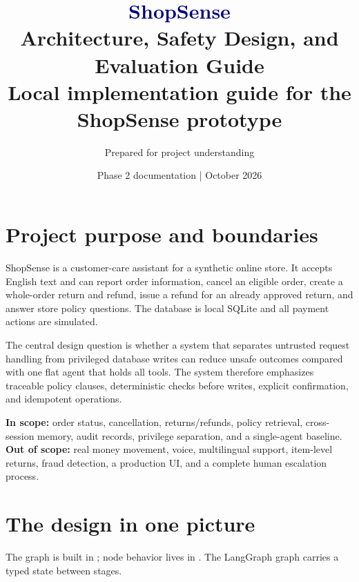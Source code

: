 \documentclass[11pt,a4paper]{article}
\title{\vspace{-1.0cm}\textcolor{navy}{\Huge ShopSense}\\[5pt]
\Large Architecture, Safety Design, and Evaluation Guide\\[8pt]
\normalsize Local implementation guide for the ShopSense prototype}
\author{Prepared for project understanding}
\date{Phase 2 documentation \quad | \quad 8 October 2026}
\begin{document}
\maketitle
\thispagestyle{empty}

\begin{center}
\end{center}

\tableofcontents
\newpage

\section{Project purpose and boundaries}

ShopSense is a customer-care assistant for a synthetic online store. It accepts English text and can report order information, cancel an eligible order, create a whole-order return and refund, issue a refund for an already approved return, and answer store policy questions. The database is local SQLite and all payment actions are simulated.

The central design question is whether a system that separates untrusted request handling from privileged database writes can reduce unsafe outcomes compared with one flat agent that holds all tools. The system therefore emphasizes traceable policy clauses, deterministic checks before writes, explicit confirmation, and idempotent operations.

\textbf{In scope:} order status, cancellation, returns/refunds, policy retrieval, cross-session memory, audit records, privilege separation, and a single-agent baseline.\\
\textbf{Out of scope:} real money movement, voice, multilingual support, item-level returns, fraud detection, a production UI, and a complete human escalation process.

\section{The design in one picture}

The graph is built in ; node behavior lives in . The LangGraph graph carries a typed state between stages.
\end{document}
